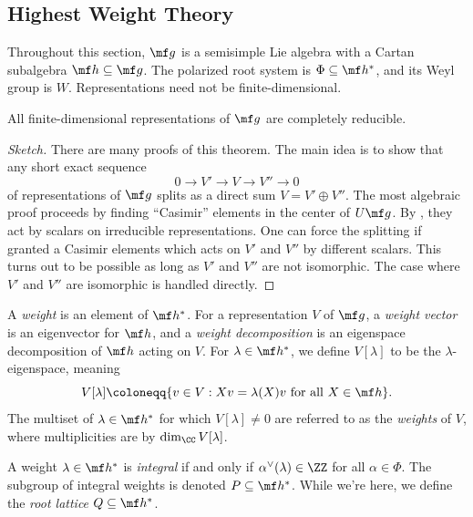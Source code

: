 \documentclass{article}
\begin{document}
\subsection{Highest Weight Theory} \label{subsec:highest-weight}
\begin{conv} \label{conv:ss-rep-theory}
	Throughout this section, $\mf g$ is a semisimple Lie algebra with a Cartan subalgebra $\mf h\subseteq\mf g$. The polarized root system is $\Phi\subseteq\mf h^*$, and its Weyl group is $W$. Representations need not be finite-dimensional.
\end{conv}
\begin{theorem} \label{thm:ss-rep-reduces}
	All finite-dimensional representations of $\mf g$ are completely reducible.
\end{theorem}
\begin{proof}[Sketch]
	There are many proofs of this theorem. The main idea is to show that any short exact sequence
	\[0\to V'\to V\to V''\to0\]
	of representations of $\mf g$ splits as a direct sum $V=V'\oplus V''$. The most algebraic proof proceeds by finding ``Casimir'' elements in the center of $U\mf g$. By , they act by scalars on irreducible representations. One can force the splitting if granted a Casimir elements which acts on $V'$ and $V''$ by different scalars. This turns out to be possible as long as $V'$ and $V''$ are not isomorphic. The case where $V'$ and $V''$ are isomorphic is handled directly.
\end{proof}
\begin{definition}
	A \textit{weight} is an element of $\mf h^*$. For a representation $V$ of $\mf g$, a \textit{weight vector} is an eigenvector for $\mf h$, and a \textit{weight decomposition} is an eigenspace decomposition of $\mf h$ acting on $V$. For $\lambda\in\mf h^*$, we define $V[\lambda]$ to be the $\lambda$-eigenspace, meaning
	\[V[\lambda]\coloneqq\{v\in V:Xv=\lambda(X)v\text{ for all }X\in\mf h\}.\]
	The multiset of $\lambda\in\mf h^*$ for which $V[\lambda]\ne0$ are referred to as the \textit{weights} of $V$, where multiplicities are by $\dim_\CC V[\lambda]$.
\end{definition}
\begin{definition}[integral]
	A weight $\lambda\in\mf h^*$ is \textit{integral} if and only if $\alpha^\lor(\lambda)\in\ZZ$ for all $\alpha\in\Phi$. The subgroup of integral weights is denoted $P\subseteq\mf h^*$. While we're here, we define the \textit{root lattice} $Q\subseteq\mf h^*$.
\end{definition}
\end{document}
